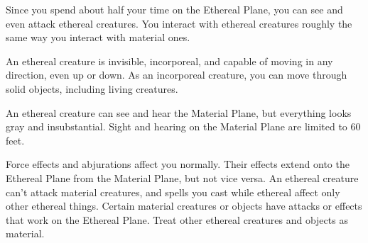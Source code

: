 Since you spend about half your time on the Ethereal Plane, you can see and even 
attack ethereal creatures. You interact with ethereal creatures roughly the same 
way you interact with material ones.

An ethereal creature is invisible, incorporeal, and capable of moving in any direction, 
even up or down. As an incorporeal creature, you can move through solid objects, 
including living creatures.

An ethereal creature can see and hear the Material Plane, but everything looks 
gray and insubstantial. Sight and hearing on the Material Plane are limited to 
60 feet.

Force effects and abjurations affect you normally. Their effects extend onto the 
Ethereal Plane from the Material Plane, but not vice versa. An ethereal creature 
can't attack material creatures, and spells you cast while ethereal affect only 
other ethereal things. Certain material creatures or objects have attacks or effects 
that work on the Ethereal Plane. Treat other ethereal creatures and objects as 
material.

